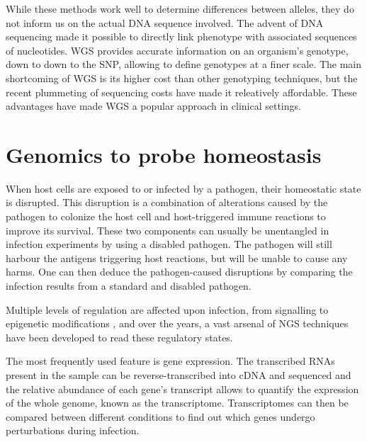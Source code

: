 While these methods work well to determine differences between alleles, they do not inform us on the actual DNA sequence involved. The advent of DNA sequencing made it possible to directly link phenotype with associated sequences of nucleotides. \acrfull{WGS} provides accurate information on an organism's genotype, down to down to the \acrfull{SNP}, allowing to define genotypes at a finer scale. The main shortcoming of \acrshort{WGS} is its higher cost than other genotyping techniques, but the recent plummeting of sequencing costs have made it releatively affordable. These advantages have made \acrshort{WGS} a popular approach in clinical settings.

\section{Genomics to probe homeostasis}

When host cells are exposed to or infected by a pathogen, their homeostatic state is disrupted. This disruption is a combination of alterations caused by the pathogen to colonize the host cell and host-triggered immune reactions to improve its survival. These two components can usually be unentangled in infection experiments by using a disabled pathogen. The pathogen will still harbour the antigens triggering host reactions, but will be unable to cause any harms. One can then deduce the pathogen-caused disruptions by comparing the infection results from a standard and disabled pathogen. 

Multiple levels of regulation are affected upon infection, from signalling to epigenetic modifications \cite{rolandoLegionellaPneumophilaType2014}, and over the years, a vast arsenal of NGS techniques have been developed to read these regulatory states. 

The most frequently used feature is gene expression. The transcribed RNAs present in the sample can be reverse-transcribed into cDNA and sequenced and the relative abundance of each gene's transcript allows to quantify the expression of the whole genome, known as the transcriptome. Transcriptomes can then be compared between different conditions to find out which genes undergo perturbations during infection. 

